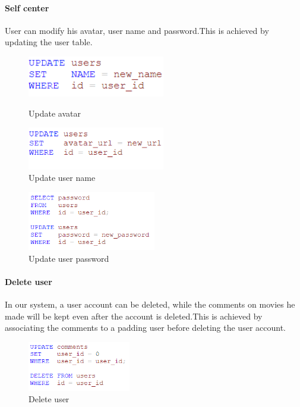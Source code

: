 \begin{CJK*}{UTF8}{gbsn}
\paragraph{Self center}
User can modify his avatar, user name and password.This is achieved by updating the user table.
\begin{figure}[htbp]
\centering
\label{avatar}
\begin{minipage}[t]{0.45\textwidth}
\centering
\includegraphics[width=6cm]{avatar.png}
\caption{Update avatar}
\end{minipage}
\begin{minipage}[t]{0.45\textwidth}
\centering
\includegraphics[width=6cm]{name.png}
\caption{Update user name}
\end{minipage}
\end{figure}

\begin{figure}[htbp]
\centering
\includegraphics[width=0.5\textwidth]{password.png}
\caption{Update user password}
\end{figure}




\paragraph{Delete user}
In our system, a user account can be deleted, while the comments on movies he made will be kept even after the account is deleted.This is achieved by associating the comments to a padding user before deleting the user account.
\begin{figure}[h]
    \label{suer delete}
    \centering
    \includegraphics[width=0.4\textwidth]{user_del.png}
    \caption{Delete user}
\end{figure}



\end{CJK*}
